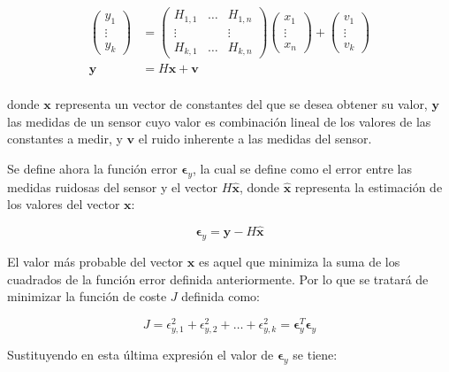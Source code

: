 \begin{equation}
\begin{split}
	\begin{pmatrix}	y_1 \\ \vdots \\ y_k \end{pmatrix} &=
	\begin{pmatrix}	H_{1,1} & \ldots & H_{1,n} \\ 
					\vdots &  & \vdots \\ 
					H_{k,1} & \ldots & H_{k,n}
	\end{pmatrix} \begin{pmatrix}	x_1 \\ \vdots \\ x_n \end{pmatrix} 
	+ \begin{pmatrix}	v_1 \\ \vdots \\ v_k \end{pmatrix}\\
	\boldsymbol{y} &= H\boldsymbol{x} + \boldsymbol{v} \\
\end{split}
\label{eq:sist1}
\end{equation}

\noindent
donde $ \boldsymbol{x} $ representa un vector de constantes del que se desea obtener su valor, $ \boldsymbol{y} $ las medidas de un sensor cuyo valor es combinación lineal de los valores de las constantes a medir, y $ \boldsymbol{v} $ el ruido inherente a las medidas del sensor. \par 

Se define ahora la función error $ \boldsymbol{\epsilon}_y $, la cual se define como el error entre las medidas ruidosas del sensor y el vector $ H\boldsymbol{\hat{x}} $, donde $\boldsymbol{\hat{x}}$ representa la estimación de los valores del vector $\boldsymbol{x}$:

\[ \boldsymbol{\epsilon}_y = \boldsymbol{y} - H\boldsymbol{\hat{x}} \]

El valor más probable del vector $ \boldsymbol{x} $ es aquel que minimiza la suma de los cuadrados de la función error definida anteriormente. Por lo que se tratará de minimizar la función de coste $ J $ definida como:

\[ J = \epsilon_{y,1}^2 + \epsilon_{y,2}^2 + \ldots + \epsilon_{y,k}^2 = \boldsymbol{\epsilon}_y^T \boldsymbol{\epsilon}_y\]

Sustituyendo en esta última expresión el valor de $ \boldsymbol{\epsilon}_y $ se tiene:

